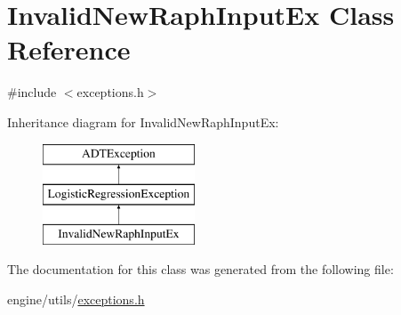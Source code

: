\hypertarget{classInvalidNewRaphInputEx}{
\section{InvalidNewRaphInputEx Class Reference}
\label{classInvalidNewRaphInputEx}
}


{\ttfamily \#include $<$exceptions.h$>$}

Inheritance diagram for InvalidNewRaphInputEx:\begin{figure}[H]
\begin{center}
\leavevmode
\includegraphics[height=3cm]{classInvalidNewRaphInputEx}
\end{center}
\end{figure}


The documentation for this class was generated from the following file:\begin{DoxyCompactItemize}
\item 
engine/utils/\hyperlink{exceptions_8h}{exceptions.h}\end{DoxyCompactItemize}
